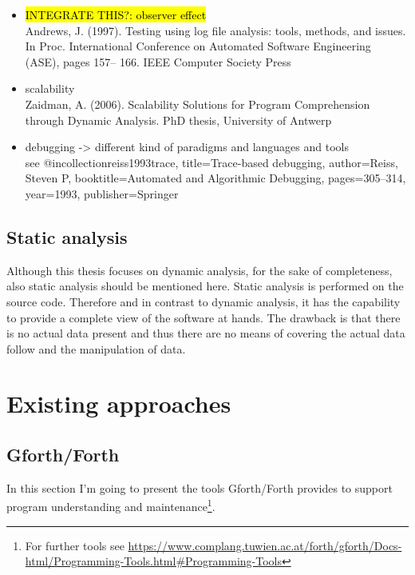\begin{itemize}
\item \hl{INTEGRATE THIS?: observer effect} \\
Andrews, J. (1997). Testing using log file analysis: tools, methods, and issues.
In Proc. International Conference on Automated Software Engineering (ASE), pages 157–
166. IEEE Computer Society Press
\item scalability \\
Zaidman, A. (2006). Scalability Solutions for Program Comprehension through Dynamic
Analysis. PhD thesis, University of Antwerp
\item debugging -> different kind of paradigms and languages and tools\\
see @incollection{reiss1993trace,
title={Trace-based debugging},
author={Reiss, Steven P},
booktitle={Automated and Algorithmic Debugging},
pages={305--314},
year={1993},
publisher={Springer}
}
\end{itemize}

\subsection{Static analysis}

Although this thesis focuses on dynamic analysis, for the sake of completeness, also static analysis should be mentioned here.
Static analysis is performed on the source code. Therefore and in contrast to dynamic analysis, it has the capability to provide a complete view of the software at hands. The drawback is that there is no actual data present and thus there are no means of covering the actual data follow and the manipulation of data.

\section{Existing approaches}

\subsection{Gforth/Forth}

In this section I'm going to present the tools Gforth/Forth provides to support program understanding and maintenance\footnote{For further tools see \url{https://www.complang.tuwien.ac.at/forth/gforth/Docs-html/Programming-Tools.html\#Programming-Tools}}.

